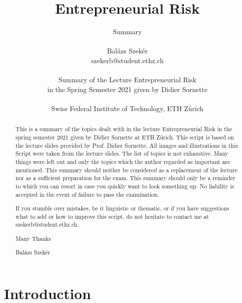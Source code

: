 \documentclass[a4paper]{article}
\title{Entrepreneurial Risk}
\author{Summary \\ \\ Balázs Szekér \\ szekerb@student.ethz.ch \\ \\
    Summary of the Lecture Entrepreneurial Risk \\
    in the Spring Semester 2021 given by Didier Sornette \\ \\
    Swiss Federal Institute of Technology, ETH Zürich}
\theoremstyle{definition}
\begin{document}
    

\begin{titlepage}
    \maketitle
    \thispagestyle{empty}
\end{titlepage}

\newpage
{}
\thispagestyle{myplain}
\begin{abstract}
    This is a summary of the topics dealt with in the lecture Entrepreneurial
    Risk in the spring semester 2021 given by Didier Sornette at ETH Zürich.
    This script is based on the lecture slides provided by Prof. Didier Sornette.
    All images and illustrations in this Script were taken from the lecture
    slides. The list of topics is not exhaustive. Many things were left out and
    only the topics which the author regarded as important are mentioned.
    This summary should neither be considered as a replacement of the lecture nor as
    a sufficient preparation for the exam. This summary should only be a reminder to
    which you can resort in case you quickly want to look something up.
    No liability is accepted in the event of failure to pass the examination.

    \vspace{1\baselineskip}

    If you stumble over mistakes, be it linguistic or thematic, or if you have suggestions
    what to add or how to improve this script, do not hesitate to contact me at
    szekerb@student.ethz.ch.

    \vspace{1\baselineskip}

    Many Thanks
    
    \vspace{1\baselineskip}

    Balázs Szekér
\end{abstract}

\newpage
\thispagestyle{myplain}
\tableofcontents

\newpage


\section{Introduction}




\end{document}
